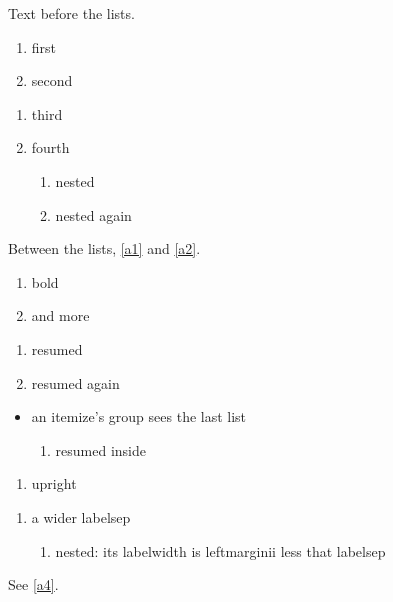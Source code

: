 \documentclass{article}
\begin{document}
Text before the lists.
\begin{enumerate}[label=\alph*)]
\item first \label{a1}
\item second
\end{enumerate}
\begin{enumerate}[label=(\roman*), start=3]
\item third \label{a2}
\item fourth
\begin{enumerate}[label*=.\arabic*]
\item nested
\item nested again
\end{enumerate}
\end{enumerate}
Between the lists, \ref{a1} and \ref{a2}.
\begin{enumerate}[label=\textbf{\arabic*.}, ref=\arabic*]
\item bold \label{a4}
\item and more
\end{enumerate}
\begin{enumerate}[resume, label=\Roman*.]
\item resumed
\item resumed again
\end{enumerate}
\begin{itemize}
\item an itemize's group sees the last list
\begin{enumerate}[resume]
\item resumed inside
\end{enumerate}
\end{itemize}
\begin{enumerate}[label=\textup{(\Alph*)}]
\item upright
\end{enumerate}
\begin{enumerate}[labelsep=2em]
\item a wider labelsep
\begin{enumerate}
\item nested: its labelwidth is leftmarginii less that labelsep
\end{enumerate}
\end{enumerate}
See \ref{a4}.
\end{document}
